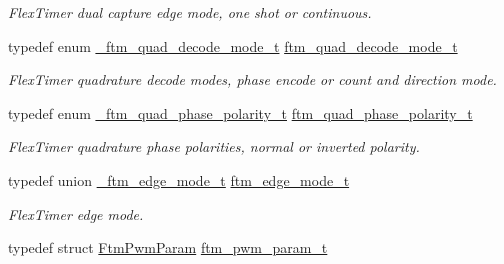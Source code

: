 \begin{DoxyCompactItemize}
\begin{DoxyCompactList}\small\item\em Flex\+Timer dual capture edge mode, one shot or continuous. \end{DoxyCompactList}\item 
typedef enum \hyperlink{group__ftm__hal_gaae2c75edcd2f32d67dc2f4ba14ff5240}{\+\_\+ftm\+\_\+quad\+\_\+decode\+\_\+mode\+\_\+t} \hyperlink{group__ftm__hal_ga1ca40e2d4c59bf3d1a88f7712aa37113}{ftm\+\_\+quad\+\_\+decode\+\_\+mode\+\_\+t}\hypertarget{group__ftm__hal_ga1ca40e2d4c59bf3d1a88f7712aa37113}{}\label{group__ftm__hal_ga1ca40e2d4c59bf3d1a88f7712aa37113}

\begin{DoxyCompactList}\small\item\em Flex\+Timer quadrature decode modes, phase encode or count and direction mode. \end{DoxyCompactList}\item 
typedef enum \hyperlink{group__ftm__hal_ga15ae8f0633b7d3fcf2b589861642cdf8}{\+\_\+ftm\+\_\+quad\+\_\+phase\+\_\+polarity\+\_\+t} \hyperlink{group__ftm__hal_ga0b71d5e8e498700f6aabc56a5bd5f00d}{ftm\+\_\+quad\+\_\+phase\+\_\+polarity\+\_\+t}\hypertarget{group__ftm__hal_ga0b71d5e8e498700f6aabc56a5bd5f00d}{}\label{group__ftm__hal_ga0b71d5e8e498700f6aabc56a5bd5f00d}

\begin{DoxyCompactList}\small\item\em Flex\+Timer quadrature phase polarities, normal or inverted polarity. \end{DoxyCompactList}\item 
typedef union \hyperlink{union__ftm__edge__mode__t}{\+\_\+ftm\+\_\+edge\+\_\+mode\+\_\+t} \hyperlink{group__ftm__hal_gac735be85729cb808e6fe1f731d8d8df1}{ftm\+\_\+edge\+\_\+mode\+\_\+t}\hypertarget{group__ftm__hal_gac735be85729cb808e6fe1f731d8d8df1}{}\label{group__ftm__hal_gac735be85729cb808e6fe1f731d8d8df1}

\begin{DoxyCompactList}\small\item\em Flex\+Timer edge mode. \end{DoxyCompactList}\item 
typedef struct \hyperlink{structFtmPwmParam}{Ftm\+Pwm\+Param} \hyperlink{group__ftm__hal_ga6d4c723a5bafd692b51acaecd62cdd2a}{ftm\+\_\+pwm\+\_\+param\+\_\+t}\hypertarget{group__ftm__hal_ga6d4c723a5bafd692b51acaecd62cdd2a}{}\label{group__ftm__hal_ga6d4c723a5bafd692b51acaecd62cdd2a}


\end{DoxyCompactItemize}
